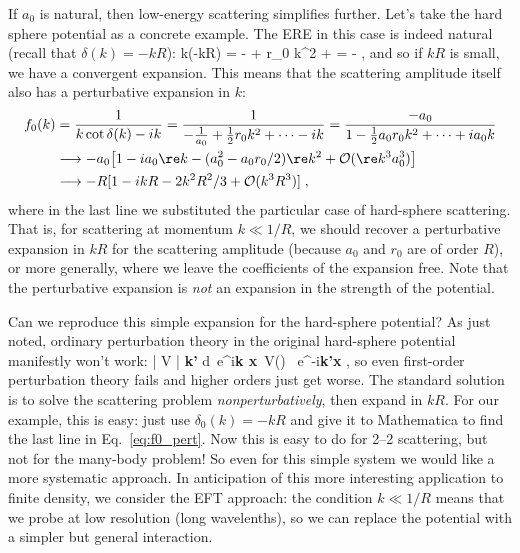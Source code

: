 If $a_0$ is {natural}, then low-energy scattering simplifies further.
Let's take the hard sphere potential as a concrete example.
The ERE in this case is indeed natural (recall that $\delta(k) = - kR$):
\beq
    k\cot(-kR) = - +  r_0 k^2 + \cdots
     = -  \;,
\eeq
and so if $kR$ is small, we have a convergent expansion.
This means that the scattering amplitude itself also
has a perturbative expansion in $k$:
\begin{align}
  {f_0(k)} &= \frac{1}{k\cot\delta(k) - ik}
  = \frac{1}{-\frac{1}{a_0} + \frac12 {r_0} k^2 + \cdots - ik}
  = \frac{-a_0}{1 - \frac12 a_0 r_0 k^2 + \cdots + ia_0 k}
  \nonumber \\ 
    & \longrightarrow -a_0 \bigl[ 1 - ia_0 {\re k} - (a_0^2 - a_0 r_0/2)
              {\re k^2} + {\cal O}({\re k^3} a_0^3) \bigr]
  \nonumber \\ 
          & \longrightarrow -R[1 - ikR - 2k^2 R^2/3 + {\cal O}(k^3R^3)] \;,
          \label{eq:f0_pert}
\end{align}
where in the last line we substituted the particular case of hard-sphere
scattering.
That is, for scattering at momentum $k \ll 1/R$, 
we should recover a perturbative expansion in $kR$ for the scattering amplitude
(because $a_0$ and $r_0$ are of order $R$),
or more generally, where we leave the coefficients of the expansion free.
%
Note that the perturbative expansion is \emph{not} an expansion in the strength of 
the potential.

Can we reproduce this simple expansion for the hard-sphere potential?
As just noted, ordinary perturbation theory in the 
original hard-sphere potential manifestly won't work:
  \beq
  \quad \Longrightarrow \quad
   | V | {\bf k'}\rangle
   \propto \int\! d{\bfx}\ 
    e^{i{\bf k \cdot x}}\, V(\bfx) \, e^{-i{\bf k'\cdot x}}
    \longrightarrow \infty \;,
  \eeq  
so even first-order perturbation theory fails and higher orders just get worse.
The standard solution is to solve the scattering problem
\emph{nonperturbatively}, then expand in $kR$.
For our example, this is easy: just use $\delta_0(k) = -kR$ and give it to Mathematica
to find the last line in Eq.~\eqref{eq:f0_pert}. 
Now this is easy to do for 2--2 scattering, but not for the many-body problem!
So even for this simple system we would like a more systematic approach.
In anticipation of this more interesting
application to finite density, we consider the EFT approach:  
the condition $k \ll 1/R $ means that we probe at low resolution (long wavelenths),  
so we can replace the potential with a simpler but general interaction.

